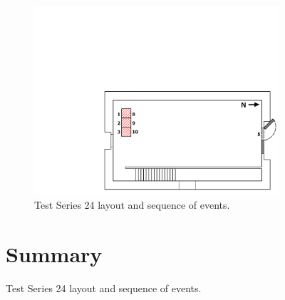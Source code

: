 \documentclass[12pt,oneside]{book}
\begin{document}
\begin{figure}[!ht]
\begin{minipage}[b]{0.8\columnwidth}
\begin{flushleft}
\begin{figure}[!ht]
\begin{minipage}[b]{0.9\columnwidth}
	\includegraphics[width=\columnwidth]{../Figures/Floor_Plans/West_Structure_1st_Floor_Test_24}
\end{minipage}
\caption{Test Series 24 layout and sequence of events.}
\label{fig:west_test_24}
\end{figure}
\FloatBarrier

\clearpage

\chapter{Summary}
\label{chap:Summary}



\appendix


\end{flushleft}
\end{minipage}
\end{figure}
\end{document}
